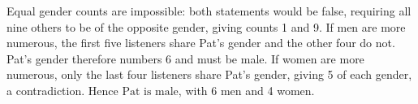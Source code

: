 Equal gender counts are impossible: both statements would be false, requiring all nine others to be of the opposite gender, giving counts 1 and 9. If men are more numerous, the first five listeners share Pat's gender and the other four do not. Pat's gender therefore numbers 6 and must be male. If women are more numerous, only the last four listeners share Pat's gender, giving 5 of each gender, a contradiction. Hence $\boxed{\text{Pat is male}}$, with 6 men and 4 women.
